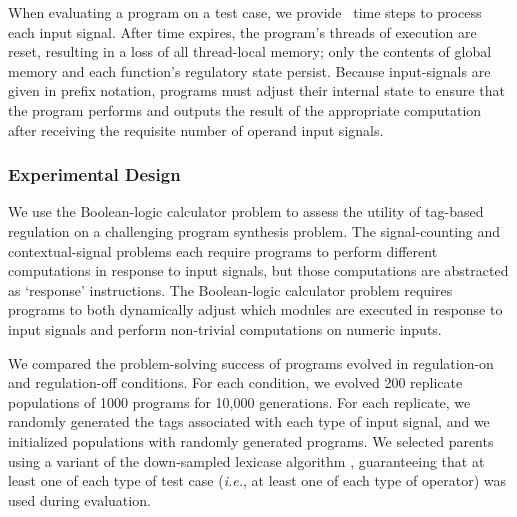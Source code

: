 When evaluating a program on a test case, we provide \CalculatorTaskCpuTimePerSignal\ time steps to process each input signal.
After time expires, the program's threads of execution are reset, resulting in a loss of all thread-local memory; only the contents of global memory and each function's regulatory state persist.
Because input-signals are given in prefix notation, programs must adjust their internal state to ensure that the program performs and outputs the result of the appropriate computation after receiving the requisite number of operand input signals.



\subsubsection{Experimental Design}

We use the Boolean-logic calculator problem to assess the utility of tag-based regulation on a challenging program synthesis problem. 
The signal-counting and contextual-signal problems each require programs to perform different computations in response to input signals, but those computations are abstracted as `response' instructions. 
The Boolean-logic calculator problem requires programs to both dynamically adjust which modules are executed in response to input signals and perform non-trivial computations on numeric inputs. 

We compared the problem-solving success of programs evolved in regulation-on and regulation-off conditions.
For each condition, we evolved 200 replicate populations of 1000 programs for 10,000 generations.
For each replicate, we randomly generated the tags associated with each type of input signal, and we initialized populations with randomly generated programs.
We selected parents using a variant of the down-sampled lexicase algorithm \citep{hernandez_random_2019}, guaranteeing that at least one of each type of test case (\textit{i.e.}, at least one of each type of operator) was used during evaluation. 

